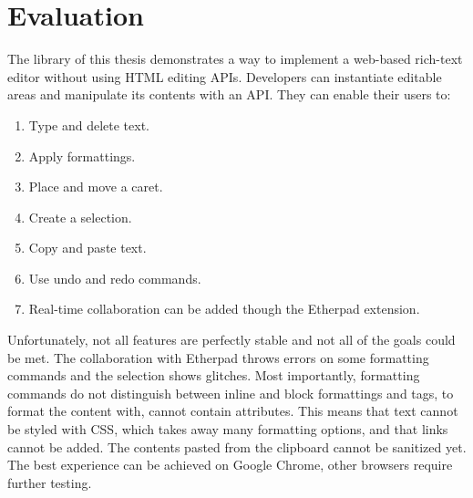 
\chapter{Evaluation}
\label{ch:evaluation}

The library of this thesis demonstrates a way to implement a web-based rich-text editor without using HTML editing APIs. Developers can instantiate editable areas and manipulate its contents with an API. They can enable their users to:

\begin{enumerate}
\item Type and delete text.
\item Apply formattings.
\item Place and move a caret.
\item Create a selection.
\item Copy and paste text.
\item Use undo and redo commands.
\item Real-time collaboration can be added though the Etherpad extension.
\end{enumerate}

Unfortunately, not all features are perfectly stable and not all of the goals could be met. The collaboration with Etherpad throws errors on some formatting commands and the selection shows glitches. 
Most importantly, formatting commands do not distinguish between inline and block formattings and tags, to format the content with, cannot contain attributes. This means that text cannot be styled with CSS, which takes away many formatting options, and that links cannot be added. The contents pasted from the clipboard cannot be sanitized yet.
The best experience can be achieved on Google Chrome, other browsers require further testing.





